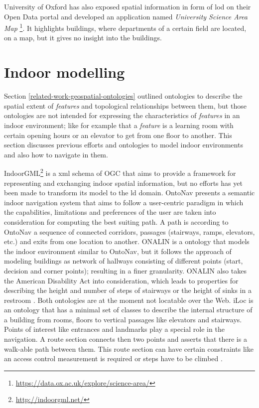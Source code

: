 \documentclass[draft,final]{vutinfth} %
\begin{document}
University of Oxford has also exposed spatial information in form of \gls{lod} on their Open Data portal and developed an application named \textit{University Science Area Map} \footnote{\url{https://data.ox.ac.uk/explore/science-area/}}. It highlights buildings, where departments of a certain field are located, on a map, but it gives no insight into the buildings.

\section{Indoor modelling}
\label{related-work-indoor-modelling}
Section \ref{related-work-geospatial-ontologies} outlined ontologies to describe the spatial extent of \textit{features} and topological relationships between them, but those ontologies are not intended for expressing the characteristics of \textit{features} in an indoor environment; like for example that a \textit{feature} is a learning room with certain opening hours or an elevator to get from one floor to another. This section discusses previous efforts and ontologies to model indoor environments and also how to navigate in them.

IndoorGML\footnote{\url{http://indoorgml.net/}} is a \gls{xml} schema of OGC that aims to provide a framework for representing and exchanging indoor spatial information, but no efforts has yet been made to transform its model to the \gls{ld} domain. OntoNav presents a semantic indoor navigation system that aims to follow a user-centric paradigm in which the capabilities, limitations and preferences of the user are taken into consideration for computing the best suiting path. A path is according to OntoNav a sequence of connected corridors, passages (stairways, ramps, elevators, etc.) and exits from one location to another\cite{anagnostopoulos_ontonav:_2005}. ONALIN is a ontology that models the indoor environment similar to OntoNav, but it follows the approach of modeling buildings as network of hallways consisting of different points (start, decision and corner points); resulting in a finer granularity. ONALIN also takes the American Disability Act into consideration, which leads to properties for describing the height and number of steps of stairways or the height of sinks in a restroom \cite{dudas_onalin:_2009}. Both ontologies are at the moment not locatable over the Web. iLoc is an ontology that has a minimal set of classes to describe the internal structure of a building from rooms, floors to vertical passages like elevators and stairways. Points of interest like entrances and landmarks play a special role in the navigation. A route section connects then two points and asserts that there is a walk-able path between them. This route section can have certain constraints like an access control measurement is required or steps have to be climbed \cite{szasz_ilocbuilding_2010}.
\end{document}
